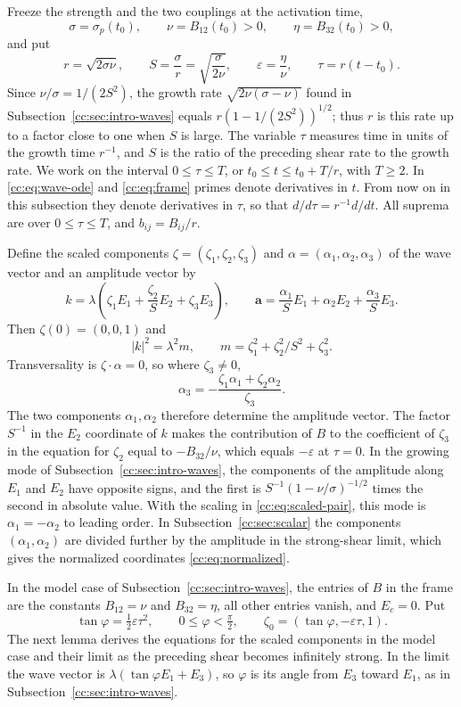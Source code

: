 Freeze the strength and the two couplings at the activation time,
\[
 \sigma=\sigma_p(t_0),\qquad \nu=B_{12}(t_0)>0,\qquad
 \eta=B_{32}(t_0)>0,
\]
and put
\[
 r=\sqrt{2\sigma\nu},\qquad S=\frac\sigma r=\sqrt{\frac{\sigma}{2\nu}},\qquad
 \varepsilon=\frac\eta\nu,\qquad \tau=r(t-t_0).
\]
Since $\nu/\sigma=1/(2S^2)$, the growth rate
$\sqrt{2\nu(\sigma-\nu)}$ found in Subsection~\ref{cc:sec:intro-waves}
equals $r(1-1/(2S^2))^{1/2}$; thus $r$ is this rate up to a factor
close to one when $S$ is large. The variable
$\tau$ measures time in units of the growth time $r^{-1}$, and $S$ is
the ratio of the preceding shear rate to the growth rate. We work on the
interval $0\le\tau\le T$, or $t_0\le t\le t_0+T/r$, with $T\ge2$.
In \eqref{cc:eq:wave-ode} and \eqref{cc:eq:frame} primes denote
derivatives in $t$. From now on in this subsection they denote
derivatives in $\tau$, so that $d/d\tau=r^{-1}d/dt$. All suprema are
over $0\le\tau\le T$, and $b_{ij}=B_{ij}/r$.

Define the scaled components $\zeta=(\zeta_1,\zeta_2,\zeta_3)$ and
$\alpha=(\alpha_1,\alpha_2,\alpha_3)$ of the wave vector and an amplitude
vector by
\begin{equation}\label{cc:eq:scaled-pair}
 k=\lambda\left(\zeta_1E_1+\frac{\zeta_2}{S}E_2+\zeta_3E_3\right),
 \qquad
 \mathbf a=\frac{\alpha_1}{S}E_1+\alpha_2E_2+\frac{\alpha_3}{S}E_3.
\end{equation}
Then $\zeta(0)=(0,0,1)$ and
\[
 |k|^2=\lambda^2m,\qquad
 m=\zeta_1^2+\zeta_2^2/S^2+\zeta_3^2.
\]
Transversality is $\zeta\cdot\alpha=0$, so where $\zeta_3\ne0$,
\[
 \alpha_3=-\frac{\zeta_1\alpha_1+\zeta_2\alpha_2}{\zeta_3}.
\]
The two components $\alpha_1,\alpha_2$ therefore determine the amplitude
vector. The factor $S^{-1}$ in the $E_2$ coordinate of $k$ makes the
contribution of $B$ to the coefficient of $\zeta_3$ in the equation for
$\zeta_2$ equal to $-B_{32}/\nu$, which equals $-\varepsilon$ at
$\tau=0$. In the growing
mode of Subsection~\ref{cc:sec:intro-waves}, the components of the
amplitude along $E_1$ and $E_2$ have opposite signs, and the first is
$S^{-1}(1-\nu/\sigma)^{-1/2}$ times the second in absolute value.
With the scaling in \eqref{cc:eq:scaled-pair}, this mode is
$\alpha_1=-\alpha_2$ to leading order. In
Subsection~\ref{cc:sec:scalar} the components $(\alpha_1,\alpha_2)$ are
divided further by the amplitude in the strong-shear limit, which gives
the normalized coordinates \eqref{cc:eq:normalized}.

In the model case of Subsection~\ref{cc:sec:intro-waves}, the entries
of $B$ in the frame are the constants $B_{12}=\nu$ and $B_{32}=\eta$,
all other entries vanish, and $E_c=0$. Put
\begin{equation}\label{cc:eq:reference-angle}
 \tan\varphi=\tfrac12\varepsilon\tau^2,\qquad
 0\le\varphi<\tfrac\pi2,\qquad
 \zeta_0=(\tan\varphi,-\varepsilon\tau,1).
\end{equation}
The next lemma derives the equations for the scaled components in the
model case and their limit as the preceding shear becomes infinitely
strong. In the limit the wave vector is $\lambda(\tan\varphi E_1+E_3)$,
so $\varphi$ is its angle from $E_3$ toward $E_1$, as in
Subsection~\ref{cc:sec:intro-waves}.

